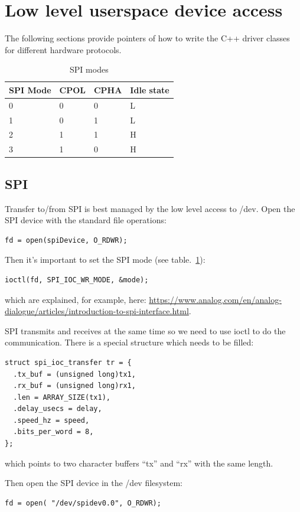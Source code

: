 \documentclass[12pt]{report}
\begin{document}
\section{Low level userspace device access}
The following sections provide pointers of how to write
the C++ driver classes for different hardware protocols.

\begin{table}[!ht]
  \begin{center}
  \caption{SPI modes\label{spimodes}}
  \begin{tabular}{l|l|l|l}
    SPI Mode & 	CPOL & 	CPHA & Idle state \\
    \hline
    0& 	0&	0& 	L \\
    1& 	0&	1& 	L \\
    2& 	1&	1& 	H \\
    3& 	1&	0& 	H \\
  \end{tabular}
  \end{center}
\end{table}

\subsection{SPI}
Transfer to/from SPI is best managed by the low level access to /dev.
Open the SPI device with the standard file operations:
\begin{verbatim}
fd = open(spiDevice, O_RDWR);
\end{verbatim}

Then it's important to set the SPI mode (see table.~\ref{spimodes}):
\begin{verbatim}
ioctl(fd, SPI_IOC_WR_MODE, &mode);
\end{verbatim}
which are explained, for example, here:
\url{https://www.analog.com/en/analog-dialogue/articles/introduction-to-spi-interface.html}.

SPI transmits and receives at the same time so we need to
use ioctl to do the communication. There is a special structure
which needs to be filled:
\begin{verbatim}
struct spi_ioc_transfer tr = {
  .tx_buf = (unsigned long)tx1,
  .rx_buf = (unsigned long)rx1,
  .len = ARRAY_SIZE(tx1),
  .delay_usecs = delay,
  .speed_hz = speed,
  .bits_per_word = 8,
};
\end{verbatim}
which points to two character buffers ``tx'' and ``rx'' with the
same length.

Then open the SPI device in the /dev filesystem:
\begin{verbatim}
fd = open( "/dev/spidev0.0", O_RDWR);
\end{verbatim}
\end{document}
